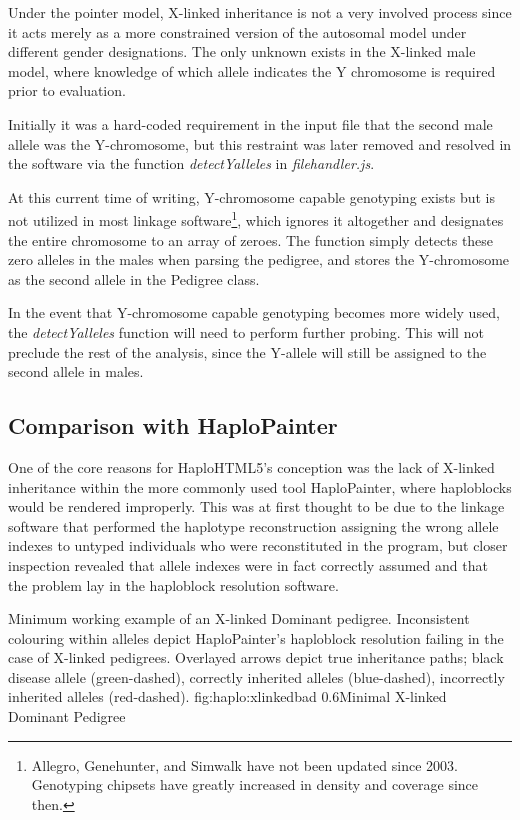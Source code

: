 Under the pointer model, X-linked inheritance is not a very involved process since it acts merely as a more constrained version of the autosomal model under different gender designations. The only unknown exists in the X-linked male model, where knowledge of which allele indicates the Y chromosome is required prior to evaluation.

Initially it was a hard-coded requirement in the input file that the second male allele was the Y-chromosome, but this restraint was later removed and resolved in the software via the function \textit{detectYalleles} in \textit{filehandler.js}.

At this current time of writing, Y-chromosome capable genotyping exists but is not utilized in most linkage software\footnote{Allegro, Genehunter, and Simwalk have not been updated since 2003. Genotyping chipsets have greatly increased in density and coverage since then.}, which ignores it altogether and designates the entire chromosome to an array of zeroes. The function simply detects these zero alleles in the males when parsing the pedigree, and stores the Y-chromosome as the second allele in the Pedigree class.

In the event that Y-chromosome capable genotyping becomes more widely used, the \textit{detectYalleles} function will need to perform further probing. This will not preclude the rest of the analysis, since the Y-allele will still be assigned to the second allele in males.

\subsection{Comparison with HaploPainter}

One of the core reasons for HaploHTML5's conception was the lack of X-linked inheritance within the more commonly used tool HaploPainter, where haploblocks would be rendered improperly. This was at first thought to be due to the linkage software that performed the haplotype reconstruction assigning the wrong allele indexes to untyped individuals who were reconstituted in the program, but closer inspection revealed that allele indexes were in fact correctly assumed and that the problem lay in the haploblock resolution software.

	{Minimum working example of an X-linked Dominant pedigree. Inconsistent colouring within alleles depict HaploPainter's haploblock resolution failing in the case of X-linked pedigrees. Overlayed arrows depict true inheritance paths; black disease allele (green-dashed), correctly inherited alleles (blue-dashed), incorrectly inherited alleles (red-dashed).}
	{fig:haplo:xlinkedbad}
	{0.6}{Minimal X-linked Dominant Pedigree}
	
